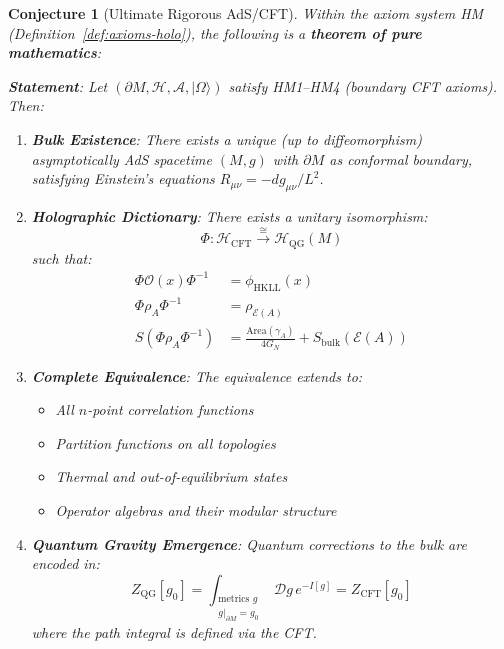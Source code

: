 \documentclass[12pt,a4paper]{article}
\newtheorem{conjecture}[theorem]{Conjecture}
\begin{document}
\begin{conjecture}[Ultimate Rigorous AdS/CFT]\label{thm:final-adscft}
Within the axiom system HM (Definition~\ref{def:axioms-holo}), the following is a \textbf{theorem of pure mathematics}:

\textbf{Statement}: Let $(\partial M, \mathcal{H}, \mathcal{A}, |\Omega\rangle)$ satisfy HM1--HM4 (boundary CFT axioms). Then:
\begin{enumerate}
    \item \textbf{Bulk Existence}: There exists a unique (up to diffeomorphism) asymptotically AdS spacetime $(M, g)$ with $\partial M$ as conformal boundary, satisfying Einstein's equations $R_{\mu\nu} = -dg_{\mu\nu}/L^2$.
    
    \item \textbf{Holographic Dictionary}: There exists a unitary isomorphism:
    \begin{equation}
    \Phi: \mathcal{H}_{\text{CFT}} \xrightarrow{\cong} \mathcal{H}_{\text{QG}}(M)
    \end{equation}
    such that:
    \begin{align}
    \Phi \mathcal{O}(x) \Phi^{-1} &= \phi_{\text{HKLL}}(x) \\
    \Phi \rho_A \Phi^{-1} &= \rho_{\mathcal{E}(A)} \\
    S(\Phi\rho_A\Phi^{-1}) &= \frac{\text{Area}(\gamma_A)}{4G_N} + S_{\text{bulk}}(\mathcal{E}(A))
    \end{align}
    
    \item \textbf{Complete Equivalence}: The equivalence extends to:
    \begin{itemize}
        \item All $n$-point correlation functions
        \item Partition functions on all topologies
        \item Thermal and out-of-equilibrium states
        \item Operator algebras and their modular structure
    \end{itemize}
    
    \item \textbf{Quantum Gravity Emergence}: Quantum corrections to the bulk are encoded in:
    \begin{equation}
    Z_{\text{QG}}[g_0] = \int_{\substack{\text{metrics } g \\ g|_{\partial M} = g_0}} \mathcal{D}g \, e^{-I[g]} = Z_{\text{CFT}}[g_0]
    \end{equation}
    where the path integral is defined via the CFT.
\end{enumerate}


\end{conjecture}
\end{document}
